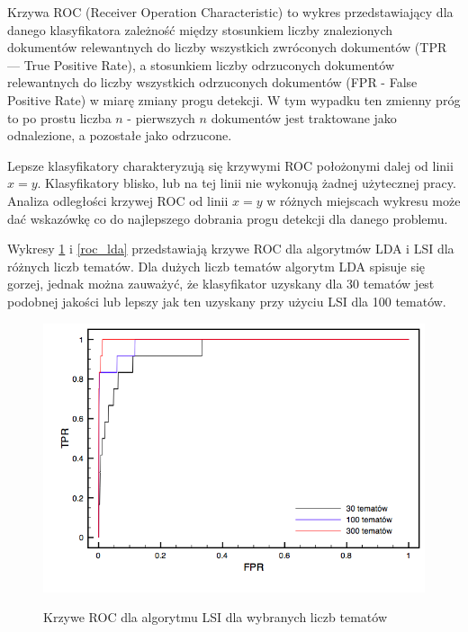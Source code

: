 \documentclass[11pt,a4paper]{article}
\begin{document}
Krzywa ROC \cite{roc-article1} (Receiver Operation Characteristic) to wykres
przedstawiający dla danego klasyfikatora zależność między stosunkiem liczby
znalezionych dokumentów relewantnych do liczby wszystkich zwróconych dokumentów
(TPR --- True Positive Rate), a stosunkiem liczby odrzuconych dokumentów
relewantnych do liczby wszystkich odrzuconych dokumentów (FPR - False Positive
Rate) w miarę zmiany progu detekcji. W tym wypadku ten zmienny próg to po
prostu liczba $n$ - pierwszych $n$ dokumentów jest traktowane jako odnalezione,
a pozostałe jako odrzucone.

Lepsze klasyfikatory charakteryzują się krzywymi ROC położonymi dalej od linii
$x = y$.  Klasyfikatory blisko, lub na tej linii nie wykonują żadnej użytecznej
pracy. Analiza odległości krzywej ROC od linii $x = y$ w różnych miejscach
wykresu może dać wskazówkę co do najlepszego dobrania progu detekcji dla danego
problemu.

Wykresy \ref{roc_lsi} i \ref{roc_lda} przedstawiają krzywe ROC dla algorytmów
LDA i LSI dla różnych liczb tematów. Dla dużych liczb tematów algorytm LDA
spisuje się gorzej, jednak można zauważyć, że klasyfikator uzyskany dla 30
tematów jest podobnej jakości lub lepszy jak ten uzyskany przy użyciu LSI dla
100 tematów.

\begin{figure}[h]
\caption{Krzywe ROC dla algorytmu LSI dla wybranych liczb tematów}
\includegraphics[width=\linewidth]{gfx/lsi_roc.png}
\label{roc_lsi}
\end{figure}
\end{document}

